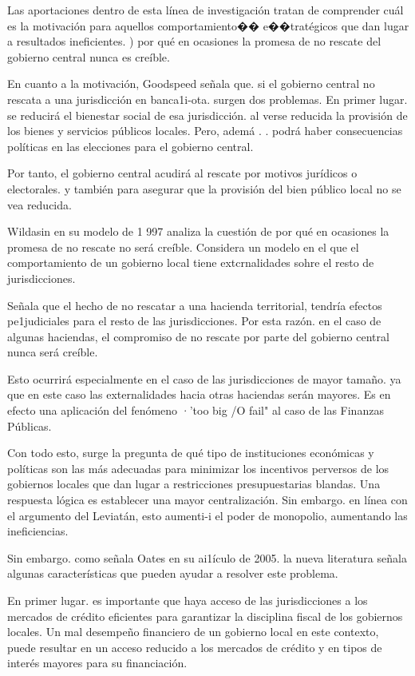 \documentclass[10pt,a4paper]{article}
\begin{document}
Las aportaciones dentro de esta línea de investigación tratan de comprender cuál es la motivación para aquellos comportamiento�� e��tratégicos que dan lugar a resultados ineficientes. ) por qué en ocasiones la promesa de no rescate del gobierno central nunca es creíble.

En cuanto a la motivación, Goodspeed señala que. si el gobierno central no rescata a una jurisdicción en banca1i-ota. surgen dos problemas. En primer lugar. se reducirá el bienestar social de esa jurisdicción. al verse reducida la provisión de los bienes y servicios públicos locales. Pero, ademá . . podrá haber consecuencias políticas en las elecciones para el gobierno central.

Por tanto, el gobierno central acudirá al rescate por motivos jurídicos o electorales. y también para asegurar que la provisión del bien público local no se vea reducida. 

Wildasin en su modelo de 1 997 analiza la cuestión de por qué en ocasiones la promesa de no rescate no será creíble. Considera un modelo en el que el comportamiento de un gobierno local tiene extcrnalidades sohre el resto de jurisdicciones.  

Señala que el hecho de no rescatar a una hacienda territorial, tendría efectos pe1judiciales para el resto de las jurisdicciones. Por esta razón. en el caso de algunas haciendas, el compromiso de no rescate por parte del gobierno central nunca será creíble.

Esto ocurrirá especialmente en el caso de las jurisdicciones de mayor tamaño. ya que en este caso las externalidades hacia otras haciendas serán mayores. Es en efecto una aplicación del fenómeno ·'too big /O fail" al caso de las Finanzas Públicas.

Con todo esto, surge la pregunta de qué tipo de instituciones económicas y políticas son las más adecuadas para minimizar los incentivos perversos de los gobiernos locales que dan lugar a restricciones presupuestarias blandas. Una respuesta lógica es establecer una mayor centralización. Sin embargo. en línea con el argumento del Leviatán, esto aumenti-i el poder de monopolio, aumentando las ineficiencias.

Sin embargo. como señala Oates en su ai1ículo de 2005. la nueva literatura señala algunas características que pueden ayudar a resolver este problema.

En primer lugar. es importante que haya acceso de las jurisdicciones a los mercados de crédito eficientes para garantizar la disciplina fiscal de los gobiernos locales. Un mal desempeño financiero de un gobierno local en este contexto, puede resultar en un acceso reducido a los mercados de crédito y en tipos de interés mayores para su financiación.
\end{document}
